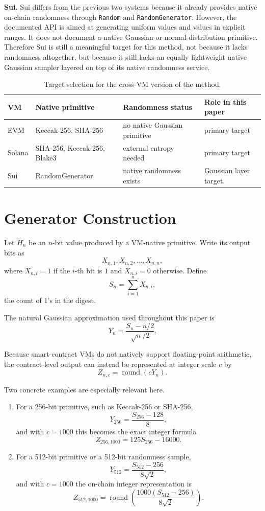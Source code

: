 \documentclass[11pt]{article}
\begin{document}
\textbf{Sui.} Sui differs from the previous two systems because it already
provides native on-chain randomness through \texttt{Random} and
\texttt{RandomGenerator}. However, the documented API is aimed at generating
uniform values and values in explicit ranges. It does not document a native
Gaussian or normal-distribution primitive. Therefore Sui is still a meaningful
target for this method, not because it lacks randomness altogether, but because
it still lacks an equally lightweight native Gaussian sampler layered on top of
its native randomness service.

\begin{table}[htbp]
\centering
\small
\begin{tabular}{llll}
\hline
VM & Native primitive & Randomness status & Role in this paper \\
\hline
EVM & Keccak-256, SHA-256 & no native Gaussian primitive & primary target \\
Solana & SHA-256, Keccak-256, Blake3 & external entropy needed & primary target \\
Sui & RandomGenerator & native randomness exists & Gaussian layer target \\
\hline
\end{tabular}
\caption{Target selection for the cross-VM version of the method.}
\label{tab:vm-scope}
\end{table}

\section{Generator Construction}

Let $H_n$ be an $n$-bit value produced by a VM-native primitive. Write its
output bits as
\[
X_{n,1}, X_{n,2}, \dots, X_{n,n},
\]
where $X_{n,i} = 1$ if the $i$-th bit is $1$ and $X_{n,i} = 0$ otherwise.
Define
\[
S_n = \sum_{i=1}^{n} X_{n,i},
\]
the count of $1$'s in the digest.

The natural Gaussian approximation used throughout this paper is
\[
Y_n = \frac{S_n - n/2}{\sqrt{n}/2}.
\]

Because smart-contract VMs do not natively support floating-point arithmetic,
the contract-level output can instead be represented at integer scale $c$ by
\[
Z_{n,c} = \operatorname{round}(cY_n).
\]

Two concrete examples are especially relevant here.
\begin{enumerate}
\item For a 256-bit primitive, such as Keccak-256 or SHA-256,
\[
Y_{256} = \frac{S_{256} - 128}{8},
\]
and with $c = 1000$ this becomes the exact integer formula
\[
Z_{256,1000} = 125S_{256} - 16000.
\]
\item For a 512-bit primitive or a 512-bit randomness sample,
\[
Y_{512} = \frac{S_{512} - 256}{8\sqrt{2}},
\]
and with $c = 1000$ the on-chain integer representation is
\[
Z_{512,1000} = \operatorname{round}\left(\frac{1000(S_{512}-256)}{8\sqrt{2}}\right).
\]
\end{enumerate}
\end{document}
